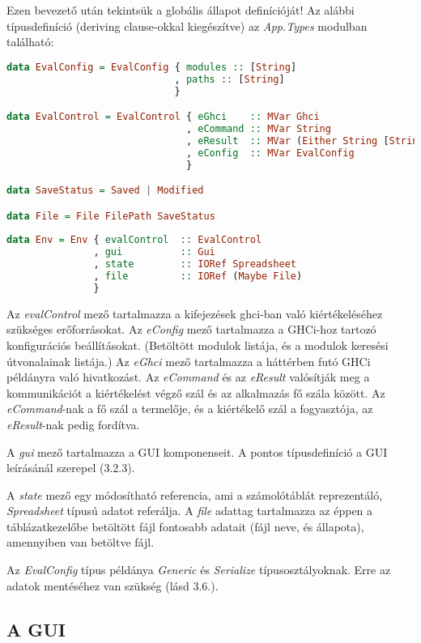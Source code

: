 Ezen bevezető után tekintsük a globális állapot definícióját! Az alábbi típusdefiníció (deriving clause-okkal kiegészítve) az \textit{App.Types} modulban található:
\begin{lstlisting}[language={Haskell}, label=src:env]
data EvalConfig = EvalConfig { modules :: [String]
                             , paths :: [String]
                             }

data EvalControl = EvalControl { eGhci    :: MVar Ghci
                               , eCommand :: MVar String
                               , eResult  :: MVar (Either String [String])
                               , eConfig  :: MVar EvalConfig 
                               }

data SaveStatus = Saved | Modified

data File = File FilePath SaveStatus
  
data Env = Env { evalControl  :: EvalControl
               , gui          :: Gui
               , state        :: IORef Spreadsheet
               , file         :: IORef (Maybe File)
               }
\end{lstlisting}

Az \textit{evalControl} mező tartalmazza a kifejezések ghci-ban való kiértékeléséhez szükséges erőforrásokat. Az \textit{eConfig} mező tartalmazza a GHCi-hoz tartozó konfigurációs beállításokat. (Betöltött modulok listája, és a modulok keresési útvonalainak listája.) Az \textit{eGhci} mező tartalmazza a háttérben futó GHCi példányra való hivatkozást. Az \textit{eCommand} és az \textit{eResult} valósítják meg a kommunikációt a kiértékelést végző szál és az alkalmazás fő szála között. Az \textit{eCommand}-nak a fő szál a termelője, és a kiértékelő szál a fogyasztója, az \textit{eResult}-nak pedig fordítva.

A \textit{gui} mező tartalmazza a GUI komponenseit. A pontos típusdefiníció a GUI leírásánál szerepel (3.2.3).

A \textit{state} mező egy módosítható referencia, ami a számolótáblát reprezentáló, \textit{Spreadsheet} típusú adatot referálja. A \textit{file} adattag tartalmazza az éppen a táblázatkezelőbe betöltött fájl fontosabb adatait (fájl neve, és állapota), amennyiben van betöltve fájl. 

Az \textit{EvalConfig} típus példánya \textit{Generic} és \textit{Serialize} típusosztályoknak. Erre az adatok mentéséhez van szükség (lásd 3.6.).

\subsection{A GUI}

